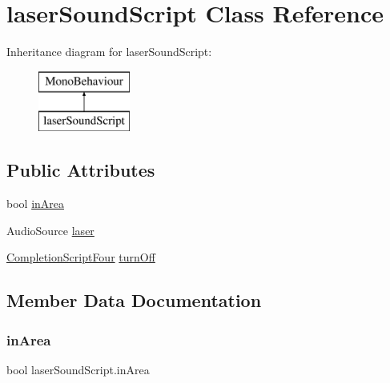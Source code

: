 \hypertarget{classlaser_sound_script}{}\section{laser\+Sound\+Script Class Reference}
\label{classlaser_sound_script}
Inheritance diagram for laser\+Sound\+Script\+:\begin{figure}[H]
\begin{center}
\leavevmode
\includegraphics[height=2.000000cm]{classlaser_sound_script}
\end{center}
\end{figure}
\subsection*{Public Attributes}
\begin{DoxyCompactItemize}
\item 
bool \hyperlink{classlaser_sound_script_afb8896ad18029a39b23b03ac4ae7242b}{in\+Area}
\item 
Audio\+Source \hyperlink{classlaser_sound_script_aae195f857d34ee642da6b5cc5ffdf6c5}{laser}
\item 
\hyperlink{class_completion_script_four}{Completion\+Script\+Four} \hyperlink{classlaser_sound_script_a59d0d535475bebd3c0d0ea799c7e8e92}{turn\+Off}
\end{DoxyCompactItemize}


\subsection{Member Data Documentation}
\mbox{\label{classlaser_sound_script_afb8896ad18029a39b23b03ac4ae7242b}} 
\subsubsection{\texorpdfstring{in\+Area}{inArea}}
{\footnotesize\ttfamily bool laser\+Sound\+Script.\+in\+Area}

\mbox{\label{classlaser_sound_script_aae195f857d34ee642da6b5cc5ffdf6c5}} 

